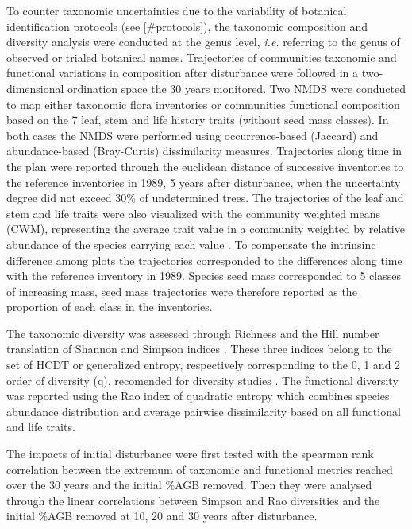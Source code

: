 \documentclass[fleqn,10pt]{ArtEcoFoG} %
\theoremstyle{definition}
\theoremstyle{definition}
\theoremstyle{definition}
\theoremstyle{remark}
\begin{document}
To counter taxonomic uncertainties due to the variability of botanical
identification protocols (see {[}\#protocols{]}), the taxonomic
composition and diversity analysis were conducted at the genus level,
\emph{i.e.} referring to the genus of observed or trialed botanical
names. Trajectories of communities taxonomic and functional variations
in composition after disturbance were followed in a two-dimensional
ordination space the 30 years monitored. Two NMDS were conducted to map
either taxonomic flora inventories or communities functional composition
based on the 7 leaf, stem and life history traits (without seed mass
classes). In both cases the NMDS were performed using occurrence-based
(Jaccard) and abundance-based (Bray-Curtis) dissimilarity measures.
Trajectories along time in the plan were reported through the euclidean
distance of successive inventories to the reference inventories in 1989,
5 years after disturbance, when the uncertainty degree did not exceed
30\% of undetermined trees. The trajectories of the leaf and stem and
life traits were also visualized with the community weighted means
(CWM), representing the average trait value in a community weighted by
relative abundance of the species carrying each value
\citep{Diaz2007, Garnier2004}. To compensate the intrinsinc difference
among plots the trajectories corresponded to the differences along time
with the reference inventory in 1989. Species seed mass corresponded to
5 classes of increasing mass, seed mass trajectories were therefore
reported as the proportion of each class in the inventories.

The taxonomic diversity was assessed through Richness and the Hill
number translation of Shannon and Simpson indices \citep{Hill1973}.
These three indices belong to the set of HCDT or generalized entropy,
respectively corresponding to the 0, 1 and 2 order of diversity (q),
recomended for diversity studies \citep{Patil1982, Tothmeresz1995}. The
functional diversity was reported using the Rao index of quadratic
entropy which combines species abundance distribution and average
pairwise dissimilarity based on all functional and life traits.

The impacts of initial disturbance were first tested with the spearman
rank correlation between the extremum of taxonomic and functional
metrics reached over the 30 years and the initial \%AGB removed. Then
they were analysed through the linear correlations between Simpson and
Rao diversities and the initial \%AGB removed at 10, 20 and 30 years
after disturbance.
\end{document}
